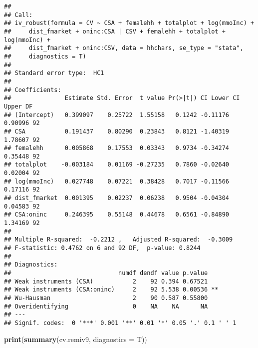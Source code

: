 \documentclass[
]{article}
\newenvironment{Shaded}{\begin{snugshade}}{\end{snugshade}}
\newcommand{\DataTypeTok}[1]{\textcolor[rgb]{0.13,0.29,0.53}{#1}}
\newcommand{\KeywordTok}[1]{\textcolor[rgb]{0.13,0.29,0.53}{\textbf{#1}}}
\newcommand{\NormalTok}[1]{#1}
\begin{document}
\begin{verbatim}
## 
## Call:
## iv_robust(formula = CV ~ CSA + femalehh + totalplot + log(mmoInc) + 
##     dist_fmarket + oninc:CSA | CSV + femalehh + totalplot + log(mmoInc) + 
##     dist_fmarket + oninc:CSV, data = hhchars, se_type = "stata", 
##     diagnostics = T)
## 
## Standard error type:  HC1 
## 
## Coefficients:
##               Estimate Std. Error  t value Pr(>|t|) CI Lower CI Upper DF
## (Intercept)   0.399097    0.25722  1.55158   0.1242 -0.11176  0.90996 92
## CSA           0.191437    0.80290  0.23843   0.8121 -1.40319  1.78607 92
## femalehh      0.005868    0.17553  0.03343   0.9734 -0.34274  0.35448 92
## totalplot    -0.003184    0.01169 -0.27235   0.7860 -0.02640  0.02004 92
## log(mmoInc)   0.027748    0.07221  0.38428   0.7017 -0.11566  0.17116 92
## dist_fmarket  0.001395    0.02237  0.06238   0.9504 -0.04304  0.04583 92
## CSA:oninc     0.246395    0.55148  0.44678   0.6561 -0.84890  1.34169 92
## 
## Multiple R-squared:  -0.2212 ,   Adjusted R-squared:  -0.3009 
## F-statistic: 0.4762 on 6 and 92 DF,  p-value: 0.8244
## 
## Diagnostics:
##                              numdf dendf value p.value   
## Weak instruments (CSA)           2    92 0.394 0.67521   
## Weak instruments (CSA:oninc)     2    92 5.538 0.00536 **
## Wu-Hausman                       2    90 0.587 0.55800   
## Overidentifying                  0    NA    NA      NA   
## ---
## Signif. codes:  0 '***' 0.001 '**' 0.01 '*' 0.05 '.' 0.1 ' ' 1
\end{verbatim}

\pagebreak

\begin{Shaded}
\begin{Highlighting}[]
\KeywordTok{print}\NormalTok{(}\KeywordTok{summary}\NormalTok{(cv.remiv9, }\DataTypeTok{diagnostics =}\NormalTok{ T))}
\end{Highlighting}
\end{Shaded}
\end{document}
